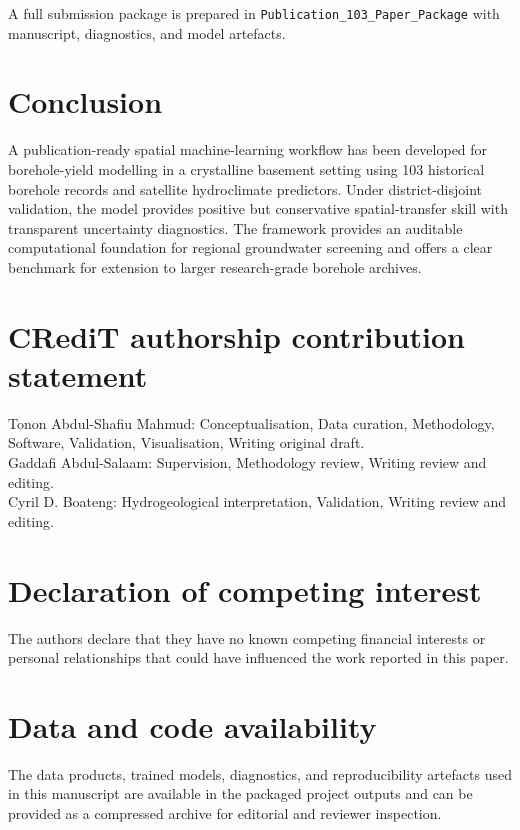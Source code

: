 \documentclass[preprint,12pt]{elsarticle}
\begin{document}
A full submission package is prepared in \texttt{Publication\_103\_Paper\_Package} with manuscript, diagnostics, and model artefacts.

\section{Conclusion}
A publication-ready spatial machine-learning workflow has been developed for borehole-yield modelling in a crystalline basement setting using 103 historical borehole records and satellite hydroclimate predictors. Under district-disjoint validation, the model provides positive but conservative spatial-transfer skill with transparent uncertainty diagnostics. The framework provides an auditable computational foundation for regional groundwater screening and offers a clear benchmark for extension to larger research-grade borehole archives.

\section*{CRediT authorship contribution statement}
Tonon Abdul-Shafiu Mahmud: Conceptualisation, Data curation, Methodology, Software, Validation, Visualisation, Writing original draft.\\
Gaddafi Abdul-Salaam: Supervision, Methodology review, Writing review and editing.\\
Cyril D. Boateng: Hydrogeological interpretation, Validation, Writing review and editing.

\section*{Declaration of competing interest}
The authors declare that they have no known competing financial interests or personal relationships that could have influenced the work reported in this paper.

\section*{Data and code availability}
The data products, trained models, diagnostics, and reproducibility artefacts used in this manuscript are available in the packaged project outputs and can be provided as a compressed archive for editorial and reviewer inspection.
\end{document}
